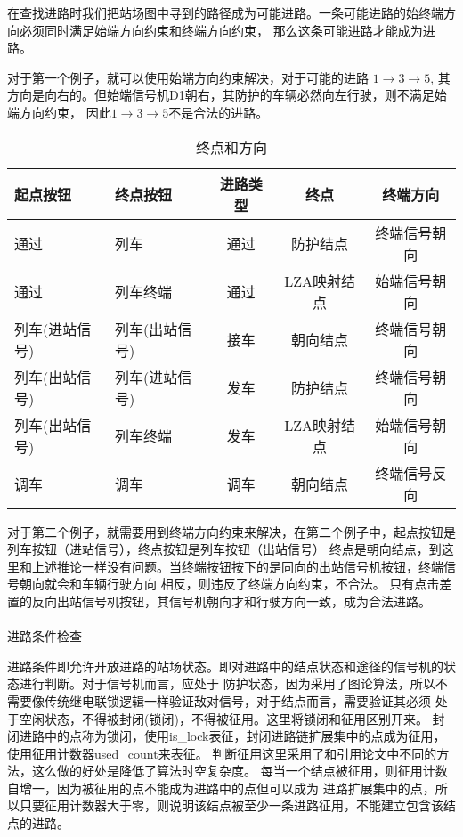 在查找进路时我们把站场图中寻到的路径成为可能进路。一条可能进路的始终端方向必须同时满足始端方向约束和终端方向约束，
那么这条可能进路才能成为进路。

对于第一个例子，就可以使用始端方向约束解决，对于可能的进路 $1 \rightarrow 3 \rightarrow 5$,
其方向是向右的。但始端信号机D1朝右，其防护的车辆必然向左行驶，则不满足始端方向约束，
因此$1 \rightarrow 3 \rightarrow 5$不是合法的进路。

\begin{table}[htpb!]
    \centering
    \caption{\label{route_end}终点和方向}
    \begin{tabular}{llccc}
        \toprule
        起点按钮       & 终点按钮       & 进路类型 & 终点        & 终端方向     \\
        \midrule
        通过           & 列车           & 通过     & 防护结点    & 终端信号朝向 \\
        通过           & 列车终端       & 通过     & LZA映射结点 & 始端信号朝向 \\
        列车(进站信号) & 列车(出站信号) & 接车     & 朝向结点    & 终端信号朝向 \\
        列车(出站信号) & 列车(进站信号) & 发车     & 防护结点    & 终端信号朝向 \\
        列车(出站信号) & 列车终端       & 发车     & LZA映射结点 & 始端信号朝向 \\
        调车           & 调车           & 调车     & 朝向结点    & 终端信号反向 \\
        \bottomrule
    \end{tabular}
\end{table}

对于第二个例子，就需要用到终端方向约束来解决，在第二个例子中，起点按钮是列车按钮（进站信号），终点按钮是列车按钮（出站信号）
终点是朝向结点，到这里和上述推论一样没有问题。当终端按钮按下的是同向的出站信号机按钮，终端信号朝向就会和车辆行驶方向
相反，则违反了终端方向约束，不合法。
只有点击差置的反向出站信号机按钮，其信号机朝向才和行驶方向一致，成为合法进路。

\paragraph{}进路条件检查

进路条件即允许开放进路的站场状态。即对进路中的结点状态和途径的信号机的状态进行判断。对于信号机而言，应处于
防护状态，因为采用了图论算法，所以不需要像传统继电联锁逻辑一样验证敌对信号，对于结点而言，需要验证其必须
处于空闲状态，不得被封闭(锁闭)，不得被征用。这里将锁闭和征用区别开来。
封闭进路中的点称为锁闭，使用is\_lock表征，封闭进路链扩展集中的点成为征用，使用征用计数器used\_count来表征。
判断征用这里采用了和引用论文中不同的方法，这么做的好处是降低了算法时空复杂度。
每当一个结点被征用，则征用计数自增一，因为被征用的点不能成为进路中的点但可以成为
进路扩展集中的点，所以只要征用计数器大于零，则说明该结点被至少一条进路征用，不能建立包含该结点的进路。

